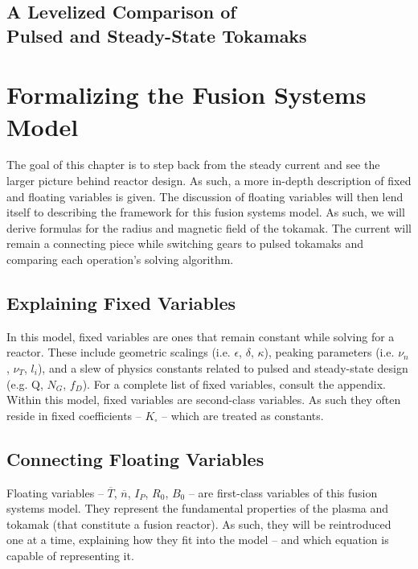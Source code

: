 \documentclass[11pt]{book}
\begin{document}
\section*{A Levelized Comparison of \\ Pulsed and Steady-State Tokamaks}

\let\cleardoublepage\relax \tableofcontents \newpage

\chapter{Formalizing the Fusion Systems Model}

The goal of this chapter is to step back from the steady current and see the larger picture behind reactor design. As such, a more in-depth description of fixed and floating variables is given. The discussion of floating variables will then lend itself to describing the framework for this fusion systems model. As such, we will derive formulas for the radius and magnetic field of the tokamak. The current will remain a connecting piece while switching gears to pulsed tokamaks and comparing each operation's solving algorithm.

\section{Explaining Fixed Variables} 

In this model, fixed variables are ones that remain constant while solving for a reactor. These include geometric scalings (i.e. $\epsilon$, $\delta$, $\kappa$), peaking parameters (i.e. $\nu_n$, $\nu_T$, $l_i$), and a slew of physics constants related to pulsed and steady-state design (e.g. Q, $N_G$, $f_D$). For a complete list of fixed variables, consult the appendix. Within this model, fixed variables are second-class variables. As such they often reside in fixed coefficients -- $K_\square$ -- which are treated as constants.

\section{Connecting Floating Variables}

Floating variables -- $\overline T$, $\overline n$, $I_P$, $R_0$, $B_0$ -- are first-class variables of this fusion systems model. They represent the fundamental properties of the plasma and tokamak (that constitute a fusion reactor). As such, they will be reintroduced one at a time, explaining how they fit into the model -- and which equation is capable of representing it.
\end{document}
